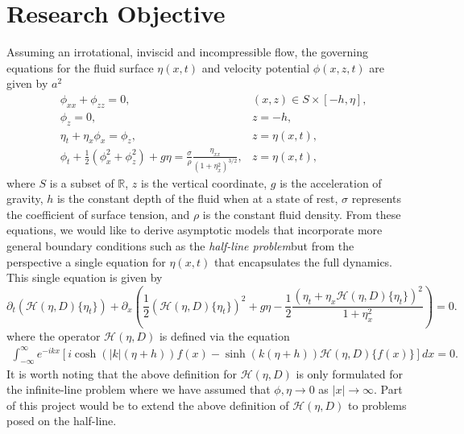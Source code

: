 \documentclass[a4paper,reqno]{article}
\begin{document}
\section{Research Objective}
    Assuming an irrotational, inviscid and incompressible flow, the governing equations for the fluid surface $\eta(x,t)$ and velocity potential $\phi(x,z,t)$ are given by
    $a^2$
    \begin{align}
    &\phi_{xx}+\phi_{zz}= 0,   &(x,z) \in S\times[-h,\eta], \label{eqn:oEuler1}\\
    &\phi_z = 0, &z= -h, \label{eqn:oEuler2}\\
    &\eta_t + \eta_x\phi_x  = \phi_z, &z = \eta(x,t), \label{eqn:oEuler3}\\
    &\displaystyle\phi_t + \frac{1}{2}\left(\phi_{x}^2  + \phi_z^2\right) + g\eta = \frac{\sigma}{\rho}\frac{\eta_{xx}}{\left(1+\eta_x^2\right)^{3/2}},  &z = \eta(x,t),\label{eqn:oEuler4}
    \end{align}
    \noindent where $S$ is a subset of $\mathbb{R}$, $z$ is the vertical coordinate, $g$ is the acceleration of gravity, $h$ is the constant depth of the fluid when at a state of rest, $\sigma$ represents the coefficient of surface tension, and $\rho$ is the constant fluid density.   From these equations, we would like to derive asymptotic models that incorporate more general boundary conditions such as the \emph{half-line problem}but from the perspective a single equation for $\eta(x,t)$ that encapsulates the full dynamics.  This single equation is given by 
    \begin{equation}
        \partial_t\left(\mathcal{H}(\eta,D)\big\lbrace\eta_t\rbrace\right) + \partial_x\left(\frac{1}{2}\left(\mathcal{H}(\eta,D)\big\lbrace\eta_t\rbrace\right)^2 + g\eta - \frac{1}{2}\frac{\left(\eta_t+\eta_x\mathcal{H}(\eta,D)\big\lbrace\eta_t\rbrace\right)^2}{1 + \eta_x^2}\right) = 0.\label{eqn:singleEquation}
        \end{equation}
    where the operator $\mathcal{H}(\eta,D)$ is defined via the equation
    \begin{align}
        \int_{-\infty}^{\infty} e^{-i{k} x}\left[ i\cosh(|{k}|(\eta+h))f( x) - \sinh(k(\eta+h))\mathcal{H}(\eta,D)\lbrace f( x)\rbrace \right]d x = 0.\label{MFA}
    \end{align} It is worth noting that the above definition for $\mathcal{H}(\eta,D)$ is only formulated for the infinite-line problem where we have assumed that $\phi,\eta \to 0$ as $\vert x \vert \to \infty$.  Part of this project would be to extend the above definition of $\mathcal{H}(\eta,D)$ to problems posed on the half-line.
\end{document}
